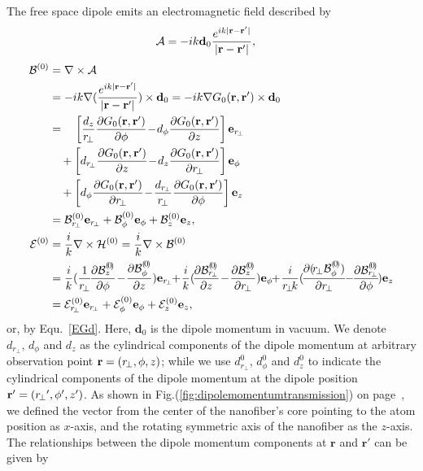 The free space dipole emits an electromagnetic field described by
\begin{align}
\mathcal{A} &= -ik \mathbf{d}_0 \frac{e^{ik|\mathbf{r}-\mathbf{r}'|}}{|\mathbf{r}-\mathbf{r}'|},
\end{align}
\begin{align}
\mathcal{B}^{(0)} &= \nabla\times \mathcal{A}\nonumber \\
&=-ik\nabla(\frac{e^{ik|\br-\br'|}}{|\br-\br'|})\times\mathbf{d}_0=-ik\nabla G_0(\br,\br')\times\mathbf{d}_0\nonumber\\
&=\quad\left[\frac{d_z}{r\!_\perp}\pp{G_0(\br,\br')}{\phi}\!-\! d_\phi\pp{G_0(\br,\br')}{z}\right]\mathbf{e}_{r\!_{\perp}}\nonumber\\
&\quad+\left[d_{r\!_\perp}\pp{G_0(\br,\br')}{z}\!-\!d_z\pp{G_0(\br,\br')}{r\!_\perp} \right]\mathbf{e}_\phi \nonumber\\
&\quad+ \left[d_\phi\pp{G_0(\br,\br')}{r\!_\perp}\!-\! \frac{d_{r\!_\perp}}{r\!_\perp}\pp{G_0(\br,\br')}{\phi} \right]\mathbf{e}_z\\
&=\mathcal{B}^{(0)}_{r\!_\perp}\mathbf{e}_{r\!_{\perp}} +\mathcal{B}^{(0)}_\phi\mathbf{e}_\phi + \mathcal{B}^{(0)}_z\mathbf{e}_z,\\
\mathcal{E}^{(0)} &= \frac{i}{k} \nabla\times \mathcal{H}^{(0)}=\frac{i}{k}\nabla\times \mathcal{B}^{(0)}\nonumber\\
&=\frac{i}{k}(\frac{1}{r\!_\perp}\!\pp{\mathcal{B}^{(\!0\!)}_z}{\phi}\!-\! \pp{\mathcal{B}^{(\!0\!)}_\phi}{z})\mathbf{e}_{r\!_{\perp}} \!\!+\! \frac{i}{k}(\!\pp{\mathcal{B}^{(\!0\!)}_{r\!_\perp}}{z} \!-\! \pp{\mathcal{B}^{(\!0\!)}_z}{r\!_\perp})\mathbf{e}_\phi \!\!+\! \frac{i}{r\!_\perp\! k} (\!\pp{(\! r\!_\perp \mathcal{B}^{(\!0\!)}_\phi)}{r\!_\perp} \!\!-\!\! \pp{\mathcal{B}^{(\!0\!)}_{r\!_\perp}}{\phi}\! )\mathbf{e}_z\\
&=\mathcal{E}^{(0)}_{r\!_\perp}\mathbf{e}_{r\!_{\perp}} +\mathcal{E}^{(0)}_\phi\mathbf{e}_\phi + \mathcal{E}^{(0)}_z\mathbf{e}_z,
\end{align}
or, by Equ.~\eqref{EGd}. Here, $ \mathbf{d}_0 $ is the dipole momentum in vacuum. We denote $d_{r\!_\perp},\, d_\phi$ and $d_z$ as the cylindrical components of the dipole momentum at arbitrary observation point ${\rm {\bf r}}=\left( {r\!_\perp ,\phi ,z}\right) $; while we use $d^0_{r\!_\perp}$, $d^0_\phi$ and $d^0_z$ to indicate the cylindrical components of the dipole momentum at the dipole position ${\rm 
{\bf {r}^{\prime }}}=\left( {{r\!_\perp }^{\prime },{\phi }^{\prime },{z}^{\prime }}\right) $. As shown in Fig.(\ref{fig:dipolemomentumtransmission}) on page~\pageref{fig:dipolemomentumtransmission}, we defined the vector from the center of the nanofiber's core pointing to the atom position as $x$-axis, and the rotating symmetric axis of the nanofiber as the $z$-axis. The relationships between the dipole momentum components at $\mathbf{r}$ and $\mathbf{r}'$ can be given by
